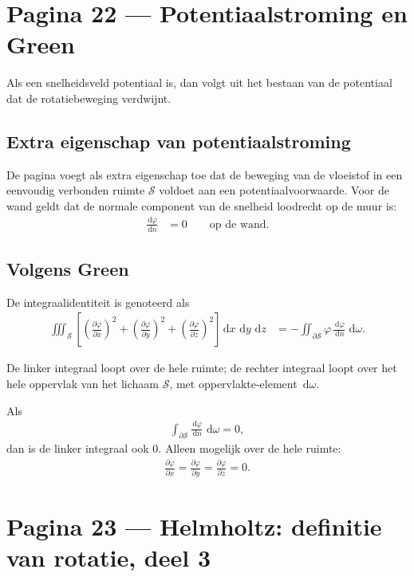 \documentclass[11pt]{article}
\newcommand{\dd}{\,\mathrm{d}}
\newcommand{\pd}[2]{\frac{\partial #1}{\partial #2}}
\newcommand{\td}[2]{\frac{\dd #1}{\dd #2}}
\begin{document}
\section*{Pagina 22 --- Potentiaalstroming en Green}

Als een snelheidsveld potentiaal is, dan volgt uit het bestaan van de potentiaal dat de rotatiebeweging verdwijnt.

\subsection*{Extra eigenschap van potentiaalstroming}

De pagina voegt als extra eigenschap toe dat de beweging van de vloeistof in een eenvoudig verbonden ruimte $\mathcal{S}$ voldoet aan een potentiaalvoorwaarde. Voor de wand geldt dat de normale component van de snelheid loodrecht op de muur is:
\begin{align*}
\td{\varphi}{n}
  &=
  0
  \qquad
  \text{op de wand.}
\end{align*}

\subsection*{Volgens Green}

De integraalidentiteit is genoteerd als
\begin{align*}
\iiint_{\mathcal{S}}
\left[
\left(\pd{\varphi}{x}\right)^2
+
\left(\pd{\varphi}{y}\right)^2
+
\left(\pd{\varphi}{z}\right)^2
\right]
\dd x\,\dd y\,\dd z
&=
-
\iint_{\partial\mathcal{S}}
\varphi\,\td{\varphi}{n}\,\dd\omega .
\end{align*}

De linker integraal loopt over de hele ruimte; de rechter integraal loopt over het hele oppervlak van het lichaam $\mathcal{S}$, met oppervlakte-element $\dd\omega$.

Als
\begin{align*}
\int_{\partial\mathcal{S}}\td{\varphi}{n}\,\dd\omega = 0,
\end{align*}
dan is de linker integraal ook $0$. Alleen mogelijk over de hele ruimte:
\begin{align*}
\pd{\varphi}{x}
=
\pd{\varphi}{y}
=
\pd{\varphi}{z}
=
0 .
\end{align*}

\newpage

\section*{Pagina 23 --- Helmholtz: definitie van rotatie, deel 3}
\end{document}
